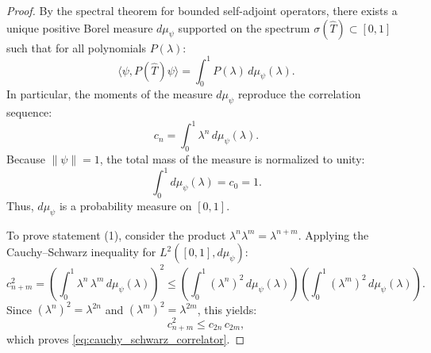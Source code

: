 \begin{proof}
By the spectral theorem for bounded self-adjoint operators, there exists a unique positive Borel measure $d\mu_\psi$ supported on the spectrum $\sigma(\hat{T}) \subset [0, 1]$ such that for all polynomials $P(\lambda)$:
\begin{equation}
\langle \psi, P(\hat{T}) \psi \rangle = \int_0^1 P(\lambda) \, d\mu_\psi(\lambda).
\end{equation}
In particular, the moments of the measure $d\mu_\psi$ reproduce the correlation sequence:
\begin{equation}
\label{eq:spectral_moment_cn}
c_n = \int_0^1 \lambda^n \, d\mu_\psi(\lambda).
\end{equation}
Because $\|\psi\| = 1$, the total mass of the measure is normalized to unity:
\begin{equation}
\int_0^1 d\mu_\psi(\lambda) = c_0 = 1.
\end{equation}
Thus, $d\mu_\psi$ is a probability measure on $[0, 1]$.

To prove statement (1), consider the product $\lambda^n \lambda^m = \lambda^{n+m}$. Applying the Cauchy--Schwarz inequality for $L^2([0, 1], d\mu_\psi)$:
\begin{equation}
c_{n+m}^2 = \left( \int_0^1 \lambda^n \, \lambda^m \, d\mu_\psi(\lambda) \right)^2 \le \left( \int_0^1 (\lambda^n)^2 \, d\mu_\psi(\lambda) \right) \left( \int_0^1 (\lambda^m)^2 \, d\mu_\psi(\lambda) \right).
\end{equation}
Since $(\lambda^n)^2 = \lambda^{2n}$ and $(\lambda^m)^2 = \lambda^{2m}$, this yields:
\begin{equation}
c_{n+m}^2 \le c_{2n} \, c_{2m},
\end{equation}
which proves \eqref{eq:cauchy_schwarz_correlator}.


\end{proof}
